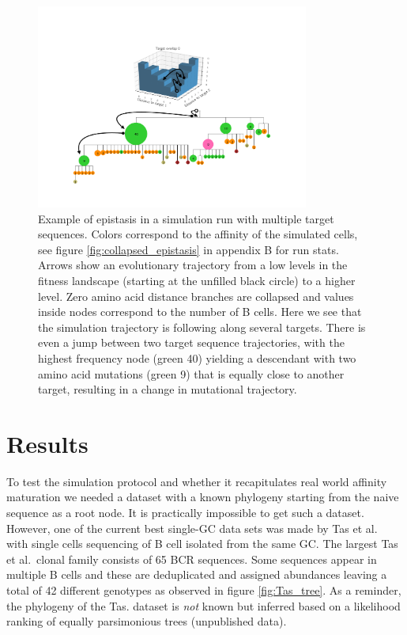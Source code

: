 \begin{figure}[!ht]
    \begin{center}
    \includegraphics[width=0.8\textwidth]{figures/epistasis_figure.pdf}
        \caption{
        \label{fig:epistasis_figure}
        Example of epistasis in a simulation run with multiple target sequences.
        Colors correspond to the affinity of the simulated cells, see figure \ref{fig:collapsed_epistasis} in appendix B for run stats.
        Arrows show an evolutionary trajectory from a low levels in the fitness landscape (starting at the unfilled black circle) to a higher level.
        Zero amino acid distance branches are collapsed and values inside nodes correspond to the number of B cells.
        Here we see that the simulation trajectory is following along several targets.
        There is even a jump between two target sequence trajectories, with the highest frequency node (green 40) yielding a descendant with two amino acid mutations (green 9) that is equally close to another target, resulting in a change in mutational trajectory.
        }
    \end{center}
\end{figure}








\section{Results}
To test the simulation protocol and whether it recapitulates real world affinity maturation we needed a dataset with a known phylogeny starting from the naive sequence as a root node.
It is practically impossible to get such a dataset.
However, one of the current best single-GC data sets was made by Tas et al.\ \cite{tas2016visualizing} with single cells sequencing of B cell isolated from the same GC.
The largest Tas et al.\ clonal family consists of 65 BCR sequences.
Some sequences appear in multiple B cells and these are deduplicated and assigned abundances leaving a total of 42 different genotypes as observed in figure \ref{fig:Tas_tree}.
As a reminder, the phylogeny of the Tas. dataset is \textit{not} known but inferred based on a likelihood ranking of equally parsimonious trees (unpublished data).

